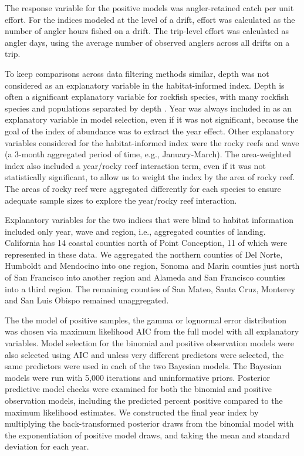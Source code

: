 \documentclass[
  authoryear,
  preprint,
  3p]{elsarticle}
\begin{document}
The response variable for the positive models was angler-retained catch
per unit effort. For the indices modeled at the level of a drift, effort
was calculated as the number of angler hours fished on a drift. The
trip-level effort was calculated as angler days, using the average
number of observed anglers across all drifts on a trip.

To keep comparisons across data filtering methods similar, depth was not
considered as an explanatory variable in the habitat-informed index.
Depth is often a significant explanatory variable for rockfish species,
with many rockfish species and populations separated by depth
\citep{Love:2002:RNP}. Year was always included in as an explanatory
variable in model selection, even if it was not significant, because the
goal of the index of abundance was to extract the year effect. Other
explanatory variables considered for the habitat-informed index were the
rocky reefs and wave (a 3-month aggregated period of time, e.g.,
January-March). The area-weighted index also included a year/rocky reef
interaction term, even if it was not statistically significant, to allow
us to weight the index by the area of rocky reef. The areas of rocky
reef were aggregated differently for each species to ensure adequate
sample sizes to explore the year/rocky reef interaction.

Explanatory variables for the two indices that were blind to habitat
information included only year, wave and region, i.e., aggregated
counties of landing. California has 14 coastal counties north of Point
Conception, 11 of which were represented in these data. We aggregated
the northern counties of Del Norte, Humboldt and Mendocino into one
region, Sonoma and Marin counties just north of San Francisco into
another region and Alameda and San Francisco counties into a third
region. The remaining counties of San Mateo, Santa Cruz, Monterey and
San Luis Obispo remained unaggregated.

The the model of positive samples, the gamma or lognormal error
distribution was chosen via maximum likelihood AIC from the full model
with all explanatory variables. Model selection for the binomial and
positive observation models were also selected using AIC and unless very
different predictors were selected, the same predictors were used in
each of the two Bayesian models. The Bayesian models were run with 5,000
iterations and uninformative priors. Posterior predictive model checks
were examined for both the binomial and positive observation models,
including the predicted percent positive compared to the maximum
likelihood estimates. We constructed the final year index by multiplying
the back-transformed posterior draws from the binomial model with the
exponentiation of positive model draws, and taking the mean and standard
deviation for each year.
\end{document}
